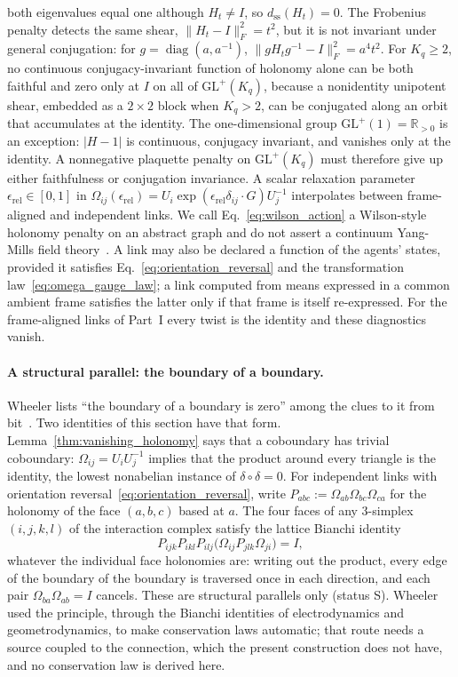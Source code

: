 both eigenvalues equal one although $H_t\ne I$, so $d_{\mathrm{ss}}(H_t)=0$. The Frobenius penalty detects the same shear, $\|H_t-I\|_F^2=t^2$, but it is not invariant under general conjugation: for $g=\operatorname{diag}(a,a^{-1})$, $\|gH_tg^{-1}-I\|_F^2=a^4t^2$. For $K_q\geq2$, no continuous conjugacy-invariant function of holonomy alone can be both faithful and zero only at $I$ on all of $\mathrm{GL}^+(K_q)$, because a nonidentity unipotent shear, embedded as a $2\times2$ block when $K_q>2$, can be conjugated along an orbit that accumulates at the identity. The one-dimensional group $\mathrm{GL}^+(1)=\mathbb{R}_{>0}$ is an exception: $|H-1|$ is continuous, conjugacy invariant, and vanishes only at the identity. A nonnegative plaquette penalty on $\mathrm{GL}^+(K_q)$ must therefore give up either faithfulness or conjugation invariance. A scalar relaxation parameter $\epsilon_{\mathrm{rel}}\in[0,1]$ in $\Omega_{ij}(\epsilon_{\mathrm{rel}})=U_i\exp(\epsilon_{\mathrm{rel}}\delta_{ij}\cdot G)U_j^{-1}$ interpolates between frame-aligned and independent links. We call Eq.~\eqref{eq:wilson_action} a Wilson-style holonomy penalty on an abstract graph and do not assert a continuum Yang-Mills field theory~\cite{Yang1954}. A link may also be declared a function of the agents' states, provided it satisfies Eq.~\eqref{eq:orientation_reversal} and the transformation law~\eqref{eq:omega_gauge_law}; a link computed from means expressed in a common ambient frame satisfies the latter only if that frame is itself re-expressed. For the frame-aligned links of Part~I every twist is the identity and these diagnostics vanish.

\paragraph{A structural parallel: the boundary of a boundary.}
\label{sec:boundary_of_boundary}
Wheeler lists ``the boundary of a boundary is zero'' among the clues to it from bit~\cite{Wheeler1990}. Two identities of this section have that form. Lemma~\ref{thm:vanishing_holonomy} says that a coboundary has trivial coboundary: $\Omega_{ij} = U_iU_j^{-1}$ implies that the product around every triangle is the identity, the lowest nonabelian instance of $\delta\circ\delta = 0$. For independent links with orientation reversal~\eqref{eq:orientation_reversal}, write $P_{abc} := \Omega_{ab}\Omega_{bc}\Omega_{ca}$ for the holonomy of the face $(a,b,c)$ based at $a$. The four faces of any 3-simplex $(i,j,k,l)$ of the interaction complex satisfy the lattice Bianchi identity
\begin{equation}
P_{ijk} P_{ikl} P_{ilj} \big(\Omega_{ij} P_{jlk} \Omega_{ji}\big) = I,
\label{eq:lattice_bianchi}
\end{equation}
whatever the individual face holonomies are: writing out the product, every edge of the boundary of the boundary is traversed once in each direction, and each pair $\Omega_{ba}\Omega_{ab} = I$ cancels. These are structural parallels only (status S). Wheeler used the principle, through the Bianchi identities of electrodynamics and geometrodynamics, to make conservation laws automatic; that route needs a source coupled to the connection, which the present construction does not have, and no conservation law is derived here.

